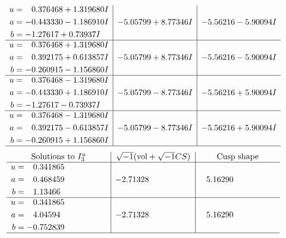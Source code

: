 \documentclass[1p]{elsarticle_modified}
\theoremstyle{definition}
\newcommand{\I}{\sqrt{-1}}
\begin{document}
$$\begin{array}{c|c|c}
\begin{aligned}
u &= \phantom{-}0.376468 + 1.319680 I \\
a &= -0.443330 - 1.186910 I \\
b &= -1.27617 + 0.73937 I\end{aligned}
 & -5.05799 + 8.77346 I & -5.56216 - 5.90094 I \\ \hline\begin{aligned}
u &= \phantom{-}0.376468 + 1.319680 I \\
a &= \phantom{-}0.392175 + 0.613857 I \\
b &= -0.260915 - 1.156860 I\end{aligned}
 & -5.05799 + 8.77346 I & -5.56216 - 5.90094 I \\ \hline\begin{aligned}
u &= \phantom{-}0.376468 - 1.319680 I \\
a &= -0.443330 + 1.186910 I \\
b &= -1.27617 - 0.73937 I\end{aligned}
 & -5.05799 - 8.77346 I & -5.56216 + 5.90094 I \\ \hline\begin{aligned}
u &= \phantom{-}0.376468 - 1.319680 I \\
a &= \phantom{-}0.392175 - 0.613857 I \\
b &= -0.260915 + 1.156860 I\end{aligned}
 & -5.05799 - 8.77346 I & -5.56216 + 5.90094 I\\
 \hline 
 \end{array}$$\newpage$$\begin{array}{c|c|c}  
\text{Solutions to }I^u_{3}& \I (\text{vol} + \sqrt{-1}CS) & \text{Cusp shape}\\
 \hline 
\begin{aligned}
u &= \phantom{-}0.341865\phantom{ +0.000000I} \\
a &= \phantom{-}0.468459\phantom{ +0.000000I} \\
b &= \phantom{-}1.13466\phantom{ +0.000000I}\end{aligned}
 & -2.71328\phantom{ +0.000000I} & \phantom{-}5.16290\phantom{ +0.000000I} \\ \hline\begin{aligned}
u &= \phantom{-}0.341865\phantom{ +0.000000I} \\
a &= \phantom{-}4.04594\phantom{ +0.000000I} \\
b &= -0.752839\phantom{ +0.000000I}\end{aligned}
 & -2.71328\phantom{ +0.000000I} & \phantom{-}5.16290\phantom{ +0.000000I}\\
 \hline 
 \end{array}$$\newpage\newpage\renewcommand{\arraystretch}{1}
\end{document}
